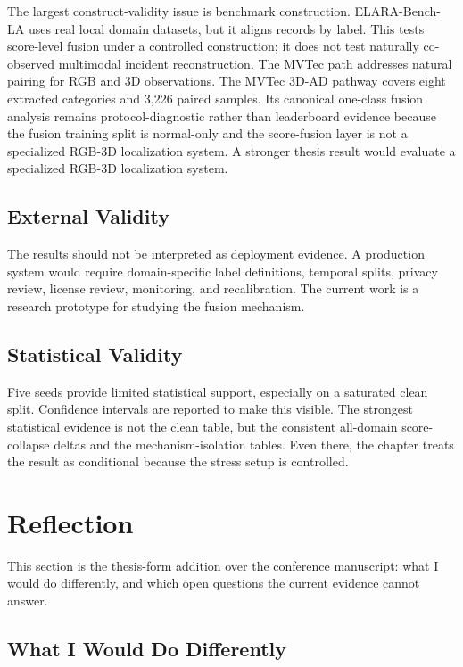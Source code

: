 \documentclass[11pt]{article}
\newcommand{\benchmark}{ELARA-Bench-LA}
\begin{document}
The largest construct-validity issue is benchmark construction. \benchmark{}
uses real local domain datasets, but it aligns records by label. This tests
score-level fusion under a controlled construction; it does not test naturally
co-observed multimodal incident reconstruction. The MVTec path addresses
natural pairing for RGB and 3D observations. The MVTec 3D-AD pathway covers eight extracted categories and 3,226 paired samples. Its canonical one-class fusion analysis remains protocol-diagnostic rather than leaderboard evidence because the fusion training split is normal-only and the score-fusion layer is not a specialized RGB-3D localization system. A stronger thesis result would evaluate a specialized RGB-3D localization system.

\subsection{External Validity}

The results should not be interpreted as deployment evidence. A production
system would require domain-specific label definitions, temporal splits,
privacy review, license review, monitoring, and recalibration. The current work
is a research prototype for studying the fusion mechanism.

\subsection{Statistical Validity}

Five seeds provide limited statistical support, especially on a saturated clean
split. Confidence intervals are reported to make this visible. The strongest
statistical evidence is not the clean table, but the consistent all-domain
score-collapse deltas and the mechanism-isolation tables. Even there, the
chapter treats the result as conditional because the stress setup is controlled.

\section{Reflection}
\label{sec:reflection}

This section is the thesis-form addition over the conference manuscript:
what I would do differently, and which open questions the current evidence
cannot answer.

\subsection{What I Would Do Differently}
\end{document}
